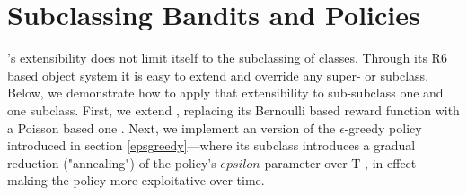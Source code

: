 \documentclass{jss}
\begin{document}
\section{Subclassing Bandits and Policies} \label{subclpb}

's extensibility does not limit itself to the subclassing of  classes. Through its R6 based object system it is easy to extend and override any  super- or subclass. Below, we demonstrate how to apply that extensibility to sub-subclass one  and one  subclass.
First, we extend , replacing its Bernoulli based reward function with a Poisson based one \citep{Presman1991}. Next, we implement an  version of the $\epsilon$-greedy policy introduced in section \ref{epsgreedy}---where its  subclass introduces a gradual reduction ("annealing") of the policy's $epsilon$ parameter over T \citep{Cesa-Bianchi1998,Kirkpatrick1983}, in effect making the policy more exploitative over time.
\end{document}

